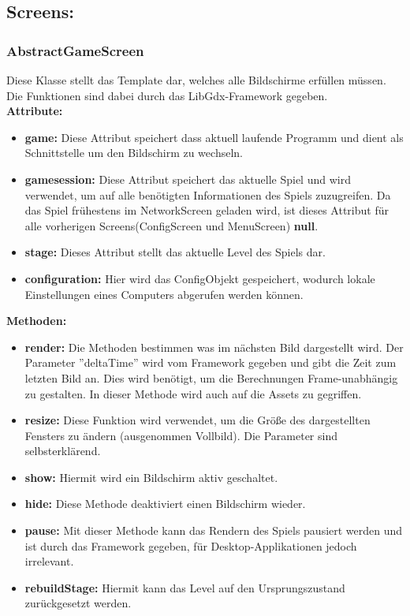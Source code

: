 \documentclass[fontsize=12pt,paper=a4,twoside]{scrartcl}
\begin{document}
\subsection{Screens:}
\subsubsection{AbstractGameScreen}
Diese Klasse stellt das Template dar, welches alle Bildschirme erfüllen müssen. Die Funktionen sind dabei durch das LibGdx-Framework gegeben.\\

\textbf{Attribute:}\\
\begin{itemize}
	\item \textbf{game:} Diese Attribut speichert dass aktuell laufende Programm und dient als Schnittstelle um den Bildschirm zu wechseln.
	\item \textbf{gamesession:} Diese Attribut speichert das aktuelle Spiel und wird verwendet, um auf alle benötigten Informationen des Spiels zuzugreifen. Da das Spiel frühestens im NetworkScreen geladen wird, ist dieses Attribut für alle vorherigen Screens(ConfigScreen und MenuScreen) \textbf{null}.
	\item \textbf{stage:} Dieses Attribut stellt das aktuelle Level des Spiels dar.
	\item \textbf{configuration:} Hier wird das ConfigObjekt gespeichert, wodurch lokale Einstellungen eines Computers abgerufen werden können.
\end{itemize}

\textbf{Methoden:}
\begin{itemize}
	\item \textbf{render:} Die Methoden bestimmen was im nächsten Bild dargestellt wird. Der Parameter ''deltaTime'' wird vom Framework gegeben und gibt die Zeit zum letzten Bild an. Dies wird benötigt, um die Berechnungen Frame-unabhängig zu gestalten. In dieser Methode wird auch auf die Assets zu gegriffen.
	\item \textbf{resize:} Diese Funktion wird verwendet, um die Größe des dargestellten Fensters zu ändern (ausgenommen Vollbild). Die Parameter sind selbsterklärend.
	\item \textbf{show:} Hiermit wird ein Bildschirm aktiv geschaltet.
	\item \textbf{hide:} Diese Methode deaktiviert einen Bildschirm wieder.
	\item \textbf{pause:} Mit dieser Methode kann das Rendern des Spiels pausiert werden und ist durch das Framework gegeben, für Desktop-Applikationen jedoch irrelevant.
	\item \textbf{rebuildStage:} Hiermit kann das Level auf den Ursprungszustand zurückgesetzt werden.
\end{itemize}
\end{document}
